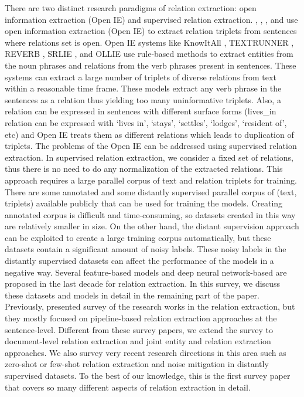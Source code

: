 There are two distinct research paradigms of relation extraction: open information extraction (Open IE) and supervised relation extraction. , , , and  use open information extraction (Open IE) to extract relation triplets from sentences where relations set is open. Open IE systems like KnowItAll , TEXTRUNNER , REVERB , SRLIE , and OLLIE  use rule-based methods to extract entities from the noun phrases and relations from the verb phrases present in sentences. These systems can extract a large number of triplets of diverse relations from text within a reasonable time frame. These models extract any verb phrase in the sentences as a relation thus yielding too many uninformative triplets. Also, a relation can be expressed in sentences with different surface forms (lives\_in relation can be expressed with `lives in', `stays', `settles', `lodges', `resident of', etc) and Open IE treats them as different relations which leads to duplication of triplets.
The problems of the Open IE can be addressed using supervised relation extraction. In supervised relation extraction, we consider a fixed set of relations, thus there is no need to do any normalization of the extracted relations. This approach requires a large parallel corpus of text and relation triplets for training. There are some annotated and some distantly supervised parallel corpus of (text, triplets) available publicly that can be used for training the models. Creating annotated corpus is difficult and time-consuming, so datasets created in this way are relatively smaller in size. On the other hand, the distant supervision approach can be exploited to create a large training corpus automatically, but these datasets contain a significant amount of noisy labels. These noisy labels in the distantly supervised datasets can affect the performance of the models in a negative way. Several feature-based models and deep neural network-based are proposed in the last decade for relation extraction. In this survey, we discuss these datasets and models in detail in the remaining part of the paper.
Previously,  presented survey of the research works in the relation extraction, but they mostly focused on pipeline-based relation extraction approaches at the sentence-level. Different from these survey papers, we extend the survey to document-level relation extraction and joint entity and relation extraction approaches. We also survey very recent research directions in this area such as zero-shot or few-shot relation extraction and noise mitigation in distantly supervised datasets. To the best of our knowledge, this is the first survey paper that covers so many different aspects of relation extraction in detail.
